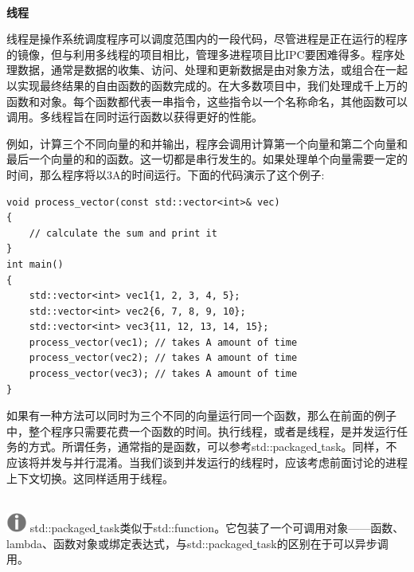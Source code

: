 \noindent\textbf{}\ \par
\textbf{线程} \ \par
线程是操作系统调度程序可以调度范围内的一段代码，尽管进程是正在运行的程序的镜像，但与利用多线程的项目相比，管理多进程项目比IPC要困难得多。程序处理数据，通常是数据的收集、访问、处理和更新数据是由对象方法，或组合在一起以实现最终结果的自由函数的函数完成的。在大多数项目中，我们处理成千上万的函数和对象。每个函数都代表一串指令，这些指令以一个名称命名，其他函数可以调用。多线程旨在同时运行函数以获得更好的性能。 \par
例如，计算三个不同向量的和并输出，程序会调用计算第一个向量和第二个向量和最后一个向量的和的函数。这一切都是串行发生的。如果处理单个向量需要一定的时间，那么程序将以3A的时间运行。下面的代码演示了这个例子: \par

\begin{lstlisting}[caption={}]
void process_vector(const std::vector<int>& vec)
{
	// calculate the sum and print it
}
int main()
{
	std::vector<int> vec1{1, 2, 3, 4, 5};
	std::vector<int> vec2{6, 7, 8, 9, 10};
	std::vector<int> vec3{11, 12, 13, 14, 15};
	process_vector(vec1); // takes A amount of time
	process_vector(vec2); // takes A amount of time
	process_vector(vec3); // takes A amount of time
}
\end{lstlisting}

如果有一种方法可以同时为三个不同的向量运行同一个函数，那么在前面的例子中，整个程序只需要花费一个函数的时间。执行线程，或者是线程，是并发运行任务的方式。所谓任务，通常指的是函数，可以参考std::packaged\underline{ }task。同样，不应该将并发与并行混淆。当我们谈到并发运行的线程时，应该考虑前面讨论的进程上下文切换。这同样适用于线程。 \par

\hspace*{\fill} \\ %
\includegraphics[width=0.05\textwidth]{images/warn}
std::packaged\underline{ }task类似于std::function。它包装了一个可调用对象——函数、lambda、函数对象或绑定表达式，与std::packaged\underline{ }task的区别在于可以异步调用。 \par
\noindent\textbf{}\ \par

